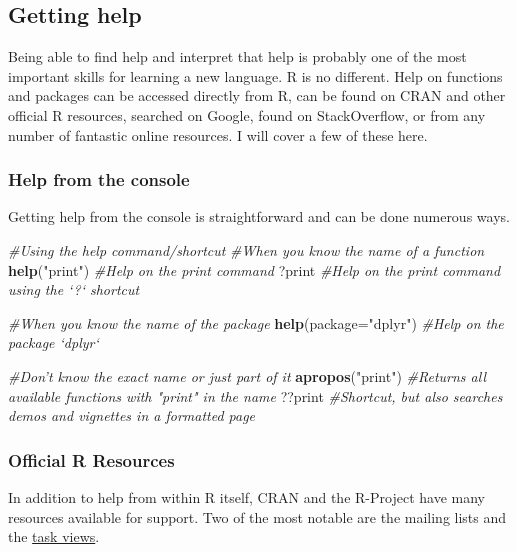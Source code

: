 \documentclass[]{article}
\newenvironment{Shaded}{\begin{snugshade}}{\end{snugshade}}
\newcommand{\CommentTok}[1]{\textcolor[rgb]{0.56,0.35,0.01}{\textit{#1}}}
\newcommand{\DataTypeTok}[1]{\textcolor[rgb]{0.13,0.29,0.53}{#1}}
\newcommand{\KeywordTok}[1]{\textcolor[rgb]{0.13,0.29,0.53}{\textbf{#1}}}
\newcommand{\NormalTok}[1]{#1}
\newcommand{\StringTok}[1]{\textcolor[rgb]{0.31,0.60,0.02}{#1}}
\begin{document}
\hypertarget{getting-help}{%
\subsection{Getting help}\label{getting-help}}

Being able to find help and interpret that help is probably one of the
most important skills for learning a new language. R is no different.
Help on functions and packages can be accessed directly from R, can be
found on CRAN and other official R resources, searched on Google, found
on StackOverflow, or from any number of fantastic online resources. I
will cover a few of these here.

\hypertarget{help-from-the-console}{%
\subsubsection{Help from the console}\label{help-from-the-console}}

Getting help from the console is straightforward and can be done
numerous ways.

\begin{Shaded}
\begin{Highlighting}[]
\CommentTok{#Using the help command/shortcut}
\CommentTok{#When you know the name of a function}
\KeywordTok{help}\NormalTok{(}\StringTok{"print"}\NormalTok{) }\CommentTok{#Help on the print command}
\NormalTok{?print }\CommentTok{#Help on the print command using the `?` shortcut}

\CommentTok{#When you know the name of the package}
\KeywordTok{help}\NormalTok{(}\DataTypeTok{package=}\StringTok{"dplyr"}\NormalTok{) }\CommentTok{#Help on the package `dplyr`}

\CommentTok{#Don't know the exact name or just part of it}
\KeywordTok{apropos}\NormalTok{(}\StringTok{"print"}\NormalTok{) }\CommentTok{#Returns all available functions with "print" in the name}
\NormalTok{??print }\CommentTok{#Shortcut, but also searches demos and vignettes in a formatted page}
\end{Highlighting}
\end{Shaded}

\hypertarget{official-r-resources}{%
\subsubsection{Official R Resources}\label{official-r-resources}}

In addition to help from within R itself, CRAN and the R-Project have
many resources available for support. Two of the most notable are the
mailing lists and the \href{http://cran.r-project.org/web/views/}{task
views}.
\end{document}
